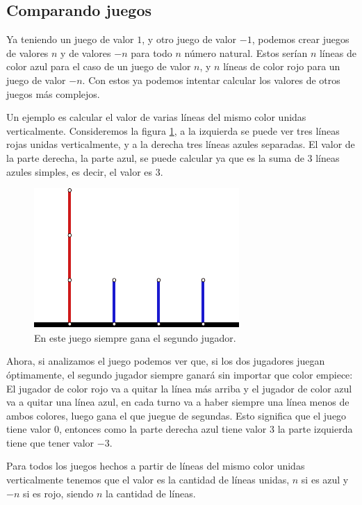 \subsection{Comparando juegos}

Ya teniendo un juego de valor $1$, y otro juego de valor $-1$, podemos crear juegos de valores $n$ y de valores $-n$ para todo $n$ n\'umero natural. Estos ser\'ian $n$ l\'ineas de color azul para el caso de un juego de valor $n$, y $n$ l\'ineas de color rojo para un juego de valor $-n$. Con estos ya podemos intentar calcular los valores de otros juegos m\'as complejos.

Un ejemplo es calcular el valor de varias l\'ineas del mismo color unidas verticalmente. Consideremos la figura \ref{figure:hackenbush-integer_val}, a la izquierda se puede ver tres l\'ineas rojas unidas verticalmente, y a la derecha tres l\'ineas azules separadas. El valor de la parte derecha, la parte azul, se puede calcular ya que es la suma de $3$ l\'ineas azules simples, es decir, el valor es $3$.

\begin{figure}[h]
    \centering
    \includegraphics[width=.5\textwidth]{images/hackenbush-integer_val.pdf}
    \caption{En este juego siempre gana el segundo jugador.}
    \label{figure:hackenbush-integer_val}
\end{figure}

Ahora, si analizamos el juego podemos ver que, si los dos jugadores juegan \'optimamente, el segundo jugador siempre ganar\'a sin importar que color empiece: El jugador de color rojo va a quitar la l\'inea m\'as arriba y el jugador de color azul va a quitar una l\'inea azul, en cada turno va a haber siempre una l\'inea menos de ambos colores, luego gana el que juegue de segundas. Esto significa que el juego tiene valor $0$, entonces como la parte derecha azul tiene valor $3$ la parte izquierda tiene que tener valor $-3$.

Para todos los juegos hechos a partir de l\'ineas del mismo color unidas verticalmente tenemos que el valor es la cantidad de l\'ineas unidas, $n$ si es azul y $-n$ si es rojo, siendo $n$ la cantidad de l\'ineas. 

